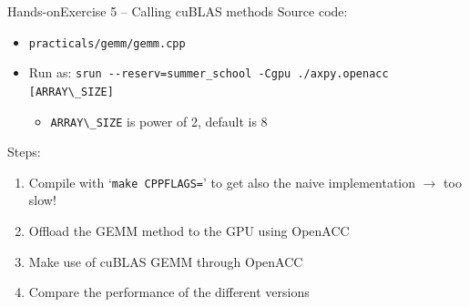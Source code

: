 \documentclass[12pt,aspectratio=169]{beamer}
\newcommand\shinline[2][]{\lstinline[style=shstyle,basicstyle=\ttfamily,#1]!#2!}
\begin{document}


\begin{frame}[fragile]{Hands-on}{Exercise 5 -- Calling cuBLAS methods}
  Source code:
  \begin{itemize}
  \item \shinline{practicals/gemm/gemm.cpp}
  \item Run as: \shinline{srun --reserv=summer_school -Cgpu ./axpy.openacc [ARRAY\_SIZE]}
    \begin{itemize}
    \item \shinline{ARRAY\_SIZE} is power of 2, default is 8
    \end{itemize}
  \end{itemize}
  \vfill
  Steps:
  \begin{enumerate}
  \item Compile with `\shinline{make CPPFLAGS=}' to get also the naive implementation $\rightarrow$ too slow!
  \item Offload the GEMM method to the GPU using OpenACC
  \item Make use of cuBLAS GEMM through OpenACC
  \item Compare the performance of the different versions
  \end{enumerate}
\end{frame}
\end{document}
